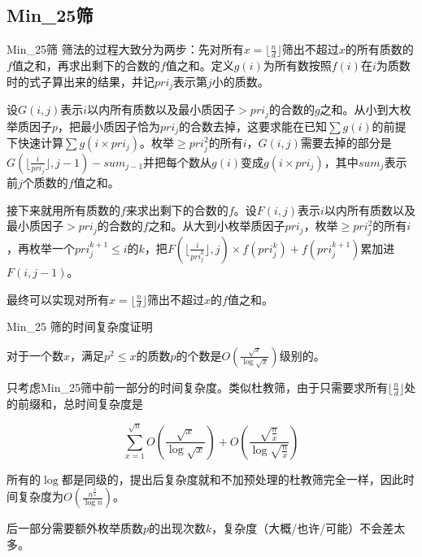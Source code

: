\documentclass{beamer}
\begin{document}
	\subsection{Min\_25筛}
	\begin{frame}{Min\_25筛}
		筛法的过程大致分为两步：先对所有$x=\lfloor\frac nd\rfloor$筛出不超过$x$的所有质数的$f$值之和，再求出剩下的合数的$f$值之和。定义$g(i)$为所有数按照$f(i)$在$i$为质数时的式子算出来的结果，并记$pri_j$表示第$j$小的质数。
		
		设$G(i,j)$表示$i$以内所有质数以及最小质因子$>pri_j$的合数的$g$之和。从小到大枚举质因子$p$，把最小质因子恰为$pri_j$的合数去掉，这要求能在已知$\sum g(i)$的前提下快速计算$\sum g(i\times pri_j)$。枚举$\ge pri_j^2$的所有$i$，$G(i,j)$需要去掉的部分是$G(\lfloor \frac{i}{pri_j} \rfloor,j-1)-sum_{j-1}$并把每个数从$g(i)$变成$g(i\times pri_j)$，其中$sum_j$表示前$j$个质数的$f$值之和。
		
		接下来就用所有质数的$f$来求出剩下的合数的$f$。设$F(i,j)$表示$i$以内所有质数以及最小质因子$>pri_j$的合数的$f$之和。从大到小枚举质因子$pri_j$，枚举$\ge pri_j^2$的所有$i$，再枚举一个$pri_j^{k+1}\le i$的$k$，把$F(\lfloor\frac {i}{pri_j^k}\rfloor,j) \times f(pri_j^k) + f(pri_j^{k+1})$累加进$F(i,j-1)$。
		
		最终可以实现对所有$x=\lfloor\frac nd\rfloor$筛出不超过$x$的$f$值之和。
		
	\end{frame}
	\begin{frame}{Min\_25 筛的时间复杂度证明}
		
		对于一个数$x$，满足$p^2 \le x$的质数$p$的个数是$O(\frac{\sqrt x}{\log \sqrt x})$级别的。
		
		只考虑Min\_25筛中前一部分的时间复杂度。类似杜教筛，由于只需要求所有$\lfloor\frac{n}{d}\rfloor$处的前缀和，总时间复杂度是
		
		$$\sum_{x=1}^{\sqrt n}O(\frac{\sqrt x}{\log \sqrt x})+O(\frac{\sqrt{\frac nx}}{\log \sqrt{\frac nx}})$$
		
		所有的$\log$都是同级的，提出后复杂度就和不加预处理的杜教筛完全一样，因此时间复杂度为$O(\frac{n^{\frac 34}}{\log n})$。
		
		后一部分需要额外枚举质数$p$的出现次数$k$，复杂度（大概/也许/可能）不会差太多。
		
	\end{frame}
\end{document}
